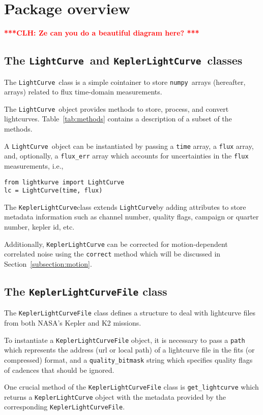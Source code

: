 \documentclass[twocolumn]{aastex62}
\newcommand{\LightCurve}{\texttt{LightCurve}}
\newcommand{\KeplerLightCurve}{\texttt{KeplerLightCurve}}
\newcommand{\numpy}{\texttt{numpy}}
\newcommand{\clh}[1]{\textcolor{red}{ \textbf{***CLH: #1 ***}}}
\begin{document}
\section{Package overview}


\clh{Ze can you do a beautiful diagram here?}

\subsection{The \LightCurve~and \KeplerLightCurve~classes}
The \LightCurve~class is a simple cointainer to store \numpy~arrays
(hereafter, arrays) related to flux time-domain measurements.

The \LightCurve~object provides methods to store, process, and
convert lightcurves. Table~\ref{tab:methods} contains a description
of a subset of the methods.

A \LightCurve~object can be instantiated by passing a \texttt{time}
array, a \texttt{flux} array, and, optionally, a \texttt{flux\_err} array
which accounts for uncertainties in the \texttt{flux} measurements, i.e.,
\begin{verbatim}
from lightkurve import LightCurve
lc = LightCurve(time, flux)
\end{verbatim}

The \KeplerLightCurve class extends \LightCurve by
adding attributes to store metadata information such as channel number,
quality flags, campaign or quarter number, kepler id, etc.

Additionally, \texttt{KeplerLightCurve} can be corrected for motion-dependent
correlated noise using the \texttt{correct} method which will be discussed in
Section~\ref{subsection:motion}.

\subsection{The \texttt{KeplerLightCurveFile} class}
The \texttt{KeplerLightCurveFile} class defines a structure to deal
with lightcurve files from both NASA's Kepler and K2 missions.

To instantiate a \texttt{KeplerLightCurveFile} object, it is necessary
to pass a \texttt{path} which represents the address (url or local path)
of a lightcurve file in the fits (or compressed) format, and a
\texttt{quality\_bitmask} string which specifies quality
flags of cadences that should be ignored.

One crucial method of the \texttt{KeplerLightCurveFile} class is
\texttt{get\_lightcurve} which returns a \texttt{KeplerLightCurve} object
with the metadata provided by the corresponding \texttt{KeplerLightCurveFile}.
\end{document}
